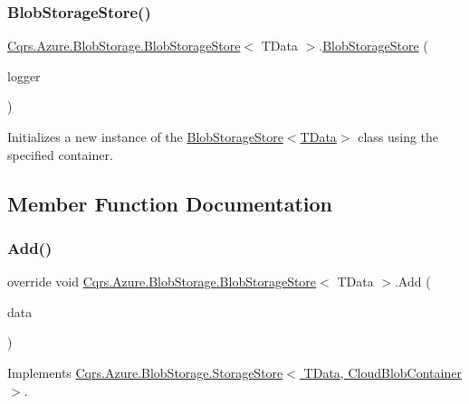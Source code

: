 \subsubsection{\texorpdfstring{Blob\+Storage\+Store()}{BlobStorageStore()}}
{\footnotesize\ttfamily \hyperlink{classCqrs_1_1Azure_1_1BlobStorage_1_1BlobStorageStore}{Cqrs.\+Azure.\+Blob\+Storage.\+Blob\+Storage\+Store}$<$ T\+Data $>$.\hyperlink{classCqrs_1_1Azure_1_1BlobStorage_1_1BlobStorageStore}{Blob\+Storage\+Store} (\begin{DoxyParamCaption}\item[{I\+Logger}]{logger }\end{DoxyParamCaption})}



Initializes a new instance of the \hyperlink{classCqrs_1_1Azure_1_1BlobStorage_1_1BlobStorageStore_ae1979c63b97dea8e207dda7b0087ee6b}{Blob\+Storage\+Store$<$\+T\+Data$>$} class using the specified container. 



\subsection{Member Function Documentation}
\mbox{\label{classCqrs_1_1Azure_1_1BlobStorage_1_1BlobStorageStore_a527ef0e0d39f9e01f4112b6bc90129b2}} 
\subsubsection{\texorpdfstring{Add()}{Add()}}
{\footnotesize\ttfamily override void \hyperlink{classCqrs_1_1Azure_1_1BlobStorage_1_1BlobStorageStore}{Cqrs.\+Azure.\+Blob\+Storage.\+Blob\+Storage\+Store}$<$ T\+Data $>$.Add (\begin{DoxyParamCaption}\item[{T\+Data}]{data }\end{DoxyParamCaption})\hspace{0.3cm}{\ttfamily [virtual]}}



Implements \hyperlink{classCqrs_1_1Azure_1_1BlobStorage_1_1StorageStore_af56bdbd7fa6650aaef5c0bab9ed55f1a}{Cqrs.\+Azure.\+Blob\+Storage.\+Storage\+Store$<$ T\+Data, Cloud\+Blob\+Container $>$}.

